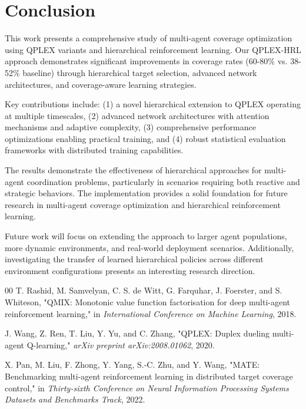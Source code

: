 \documentclass[conference]{IEEEtran}
\begin{document}
\section{Conclusion}

This work presents a comprehensive study of multi-agent coverage optimization using QPLEX variants and hierarchical reinforcement learning. Our QPLEX-HRL approach demonstrates significant improvements in coverage rates (60-80\% vs. 38-52\% baseline) through hierarchical target selection, advanced network architectures, and coverage-aware learning strategies.

Key contributions include: (1) a novel hierarchical extension to QPLEX operating at multiple timescales, (2) advanced network architectures with attention mechanisms and adaptive complexity, (3) comprehensive performance optimizations enabling practical training, and (4) robust statistical evaluation frameworks with distributed training capabilities.

The results demonstrate the effectiveness of hierarchical approaches for multi-agent coordination problems, particularly in scenarios requiring both reactive and strategic behaviors. The implementation provides a solid foundation for future research in multi-agent coverage optimization and hierarchical reinforcement learning.

Future work will focus on extending the approach to larger agent populations, more dynamic environments, and real-world deployment scenarios. Additionally, investigating the transfer of learned hierarchical policies across different environment configurations presents an interesting research direction.

\begin{thebibliography}{00}
 T. Rashid, M. Samvelyan, C. S. de Witt, G. Farquhar, J. Foerster, and S. Whiteson, "QMIX: Monotonic value function factorisation for deep multi-agent reinforcement learning," in \textit{International Conference on Machine Learning}, 2018.

 J. Wang, Z. Ren, T. Liu, Y. Yu, and C. Zhang, "QPLEX: Duplex dueling multi-agent Q-learning," \textit{arXiv preprint arXiv:2008.01062}, 2020.

 X. Pan, M. Liu, F. Zhong, Y. Yang, S.-C. Zhu, and Y. Wang, "MATE: Benchmarking multi-agent reinforcement learning in distributed target coverage control," in \textit{Thirty-sixth Conference on Neural Information Processing Systems Datasets and Benchmarks Track}, 2022.
\end{thebibliography}
\end{document}
